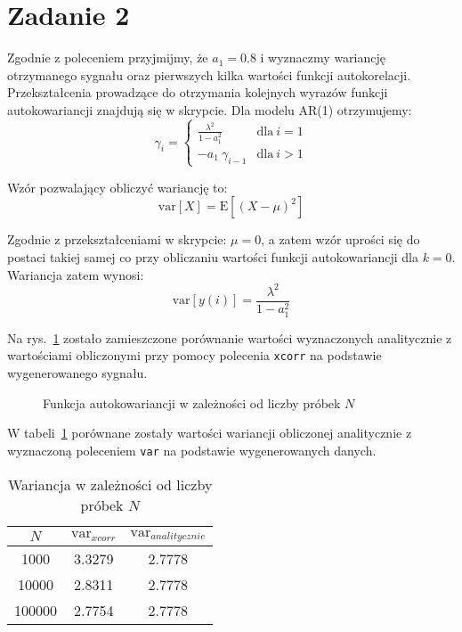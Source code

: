 \documentclass[11pt, a4paper]{article}
\begin{document}
\section*{Zadanie 2}
Zgodnie z poleceniem przyjmijmy, że $a_1 = 0.8$ i wyznaczmy wariancję otrzymanego sygnału oraz pierwszych kilka wartości funkcji autokorelacji. Przekształcenia prowadzące do otrzymania kolejnych wyrazów funkcji autokowariancji znajdują się w skrypcie. Dla modelu AR(1) otrzymujemy:
\[
	\gamma_i =
	\begin{cases}
		\frac{\lambda^2}{1 - a_1^2} & \text{dla} \ i = 1 \\
		-a_1 \ \gamma_{i-1} & \text{dla} \ i > 1
	\end{cases}
\]

Wzór pozwalający obliczyć wariancję to:
\[
	\text{var}[X] = \text{E}[(X - \mu)^2]
\]

Zgodnie z przekształceniami w skrypcie: $\mu = 0$, a zatem wzór uprości się do postaci takiej samej
co przy obliczaniu wartości funkcji autokowariancji dla $k=0$. Wariancja zatem wynosi:
\[
	\text{var}[y(i)] = \frac{\lambda^2}{1 - a_1^2}
\]

Na rys.~\ref{fig:zd2_ar} zostało zamieszczone porównanie wartości wyznaczonych analitycznie z
wartościami obliczonymi przy pomocy polecenia \texttt{xcorr} na podstawie wygenerowanego
sygnału.
\begin{figure}[p!]
	\centering
	
	\hfill%
	
	\hfill%
	
	\hfill%
	
	\caption{Funkcja autokowariancji w zależności od liczby próbek $N$}
	\label{fig:zd2_ar}
\end{figure}

W tabeli~\ref{tbl:zd2_ar} porównane zostały wartości wariancji obliczonej analitycznie z wyznaczoną
poleceniem \texttt{var} na podstawie wygenerowanych danych.
\begin{table}[htbp!]
	\centering
	\begin{tabular}{c||c|c}
		$N$ & $\text{var}_{xcorr}$ & $\text{var}_{analitycznie}$ \\
		\hline
		1000 & 3.3279 & 2.7778 \\
		10000 & 2.8311 & 2.7778 \\
		100000 & 2.7754 & 2.7778 \\
	\end{tabular}
	\caption{Wariancja w zależności od liczby próbek $N$}
	\label{tbl:zd2_ar}
\end{table}
\end{document}
